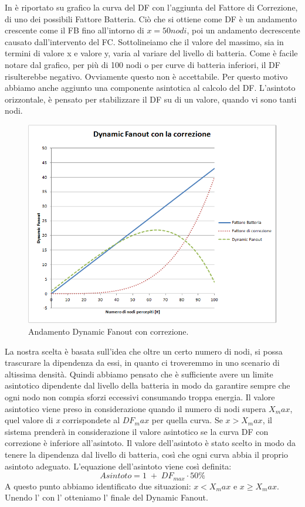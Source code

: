 In  è riportato su grafico la curva del DF con l'aggiunta del Fattore di Correzione, di uno dei possibili Fattore Batteria. Ciò che si ottiene come DF è un andamento crescente come il FB fino all'intorno di $\textit{x}=50 nodi$, poi un andamento decrescente causato dall'intervento del FC. Sottolineiamo che il valore del massimo, sia in termini di valore x e valore y, varia al variare del livello di batteria. Come è facile notare dal grafico, per più di 100 nodi o per curve di batteria inferiori, il DF risulterebbe negativo. Ovviamente questo non è accettabile. Per questo motivo abbiamo anche aggiunto una componente asintotica al calcolo del DF. L'asintoto orizzontale, è pensato per stabilizzare il DF su di un valore, quando vi sono tanti nodi.
\begin{figure}
	\centering
	\includegraphics[width=0.9\linewidth]{Images/grafici_usati/DF_andamento_teorico}
	\caption[DF teorico]{Andamento Dynamic Fanout con correzione.}
	\label{fig:DF_andamento_teorico}
\end{figure}
La nostra scelta è basata sull'idea che oltre un certo numero di nodi, si possa trascurare la dipendenza da essi, in quanto ci troveremmo in uno scenario di altissima densità. Quindi abbiamo pensato che è sufficiente avere un limite asintotico dipendente dal livello della batteria in modo da garantire sempre che ogni nodo non compia sforzi eccessivi consumando troppa energia. Il valore asintotico viene preso in considerazione quando il numero di nodi supera $\textit{X}_max$, quel valore di \textit{x} corrispondete al $DF_max$ per quella curva. Se $\textit{x}>\textit{X}_max$, il sistema prenderà in considerazione il valore asintotico se la curva DF con correzione è inferiore all'asintoto.
Il valore dell'asintoto è stato scelto in modo da tenere la dipendenza dal livello di batteria, così che ogni curva abbia il proprio asintoto adeguato. L'equazione dell'asintoto viene così definita:
\begin{equation}
	\label{eq:df_asintoto}
	Asintoto = 1\;+\;DF_{max}\cdot 50\%
\end{equation}
A questo punto abbiamo identificato due situazioni: $\textit{x}<\textit{X}_max$ e $\textit{x}\geq \textit{X}_max$. Unendo l' con l' otteniamo l' finale del Dynamic Fanout.
\medskip

